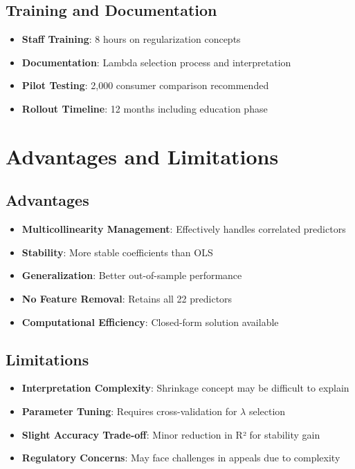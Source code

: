 \subsection{Training and Documentation}

\begin{itemize}
    \item \textbf{Staff Training}: 8 hours on regularization concepts
    \item \textbf{Documentation}: Lambda selection process and interpretation
    \item \textbf{Pilot Testing}: 2,000 consumer comparison recommended
    \item \textbf{Rollout Timeline}: 12 months including education phase
\end{itemize}

\section{Advantages and Limitations}

\subsection{Advantages}

\begin{itemize}
    \item \textbf{Multicollinearity Management}: Effectively handles correlated predictors
    \item \textbf{Stability}: More stable coefficients than OLS
    \item \textbf{Generalization}: Better out-of-sample performance
    \item \textbf{No Feature Removal}: Retains all 22 predictors
    \item \textbf{Computational Efficiency}: Closed-form solution available
\end{itemize}

\subsection{Limitations}

\begin{itemize}
    \item \textbf{Interpretation Complexity}: Shrinkage concept may be difficult to explain
    \item \textbf{Parameter Tuning}: Requires cross-validation for $\lambda$ selection
    \item \textbf{Slight Accuracy Trade-off}: Minor reduction in R² for stability gain
    \item \textbf{Regulatory Concerns}: May face challenges in appeals due to complexity
\end{itemize}

